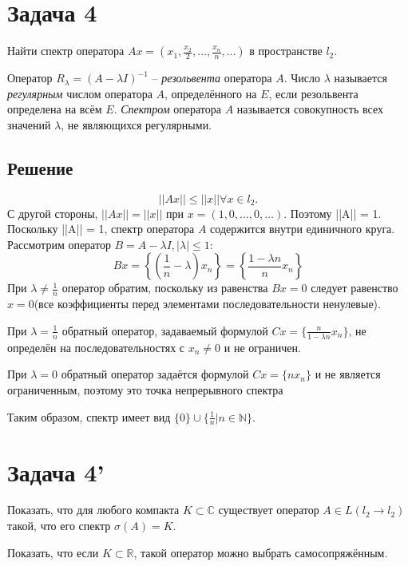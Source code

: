 \documentclass[11pt]{article}
\newcounter{th}\setcounter{th}{0}
\begin{document}
\section{Задача 4}
\label{sec:org9b9bfac}
Найти спектр оператора \(Ax = (x_1, \frac{x_2}2, \ldots, \frac{x_n}n, \ldots)\) в пространстве \(l_2\).

Оператор \(R_{\lambda} = (A - \lambda I)^{-1}\) -- \emph{резольвента} оператора \(A\). Число \(\lambda\) называется \emph{регулярным} числом оператора \(A\), определённого на \(E\), если резольвента определена на всём \(E\). \emph{Спектром} оператора \(A\) называется совокупность всех значений \(\lambda\), не являющихся регулярными.
\subsection{Решение}
\label{sec:orgd55d969}
\begin{equation*}
||Ax|| \leq ||x|| \forall x \in l_2.
\end{equation*}
С другой стороны, $||Ax|| = ||x||$ при $x = (1, 0, \ldots, 0, \ldots)$. Поэтому ||A|| = 1.
Поскольку ||A|| = 1, спектр оператора \(A\) содержится внутри единичного круга. Рассмотрим оператор \(B = A - \lambda I, |\lambda| \leq 1\):
\begin{equation}
Bx = \left\{\left(\frac1n - \lambda\right)x_n\right\} = \left\{\frac{1 - \lambda n}nx_n\right\}
\end{equation}
При $\lambda \neq \frac1n$ оператор обратим, поскольку из равенства $Bx = 0$ следует равенство $x = 0$(все коэффициенты перед элементами последовательности ненулевые).

При $\lambda = \frac1n$ обратный оператор, задаваемый формулой $Cx = \{\frac{n}{1 - \lambda n}x_n\}$, не определён на последовательностях с $x_n \neq 0$ и не ограничен.

При $\lambda = 0$ обратный оператор задаётся формулой $Cx = \{nx_n\}$ и не является ограниченным, поэтому это точка непрерывного спектра

Таким образом, спектр имеет вид $\{0\} \cup\{\frac1n | n \in \mathbb{N}\}$.
\section{Задача 4'}
\label{sec:org6ffd3d9}
Показать, что для любого компакта \(K \subset \mathbb{C}\) существует оператор \(A \in L(l_2 \rightarrow l_2)\) такой, что его спектр \(\sigma(A) = K\).

Показать, что если \(K \subset \mathbb{R}\), такой оператор можно выбрать самосопряжённым.
\end{document}
